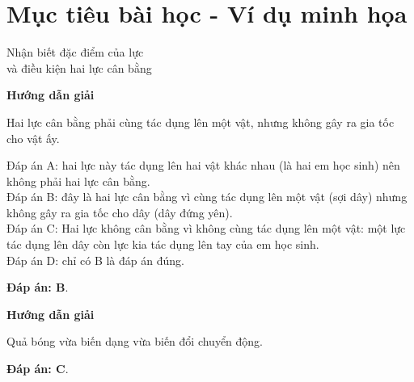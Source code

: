\section{Mục tiêu bài học - Ví dụ minh họa}
\begin{dang}{Nhận biết đặc điểm của lực\\ và điều kiện hai lực cân bằng}
	{	\begin{center}
			\textbf{Hướng dẫn giải}
		\end{center}
		Hai lực cân bằng phải cùng tác dụng lên một vật, nhưng không gây ra gia tốc cho vật ấy. 
		
		Đáp án A: hai lực này tác dụng lên hai vật khác nhau (là hai em học sinh) nên không phải hai lực cân bằng.\\ 
		Đáp án B: đây là hai lực cân bằng vì cùng tác dụng lên một vật (sợi dây) nhưng không gây ra gia tốc cho dây (dây đứng yên).\\ 
		Đáp án C: Hai lực không cân bằng vì không cùng tác dụng lên một vật: một lực tác dụng lên dây còn lực kia tác  dụng lên tay của em học sinh. \\
		Đáp án D: chỉ có B là đáp án đúng. 
		
		\textbf{Đáp án: B}.
	}
	{	\begin{center}
			\textbf{Hướng dẫn giải}
		\end{center}
		
		Quả bóng vừa biến dạng vừa biến đổi chuyển động.
		
		\textbf{Đáp án: C}.
	}
\end{dang}

